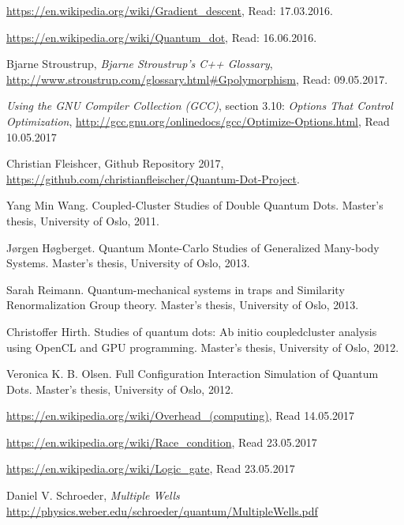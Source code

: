 \documentclass[../main.tex]{subfiles}
\begin{document}
\begin{thebibliography}{99}
 \url{https://en.wikipedia.org/wiki/Gradient_descent}, Read: 17.03.2016.

 \url{https://en.wikipedia.org/wiki/Quantum_dot}, Read: 16.06.2016.

 Bjarne Stroustrup, \emph{Bjarne Stroustrup's C++ Glossary},  \url{http://www.stroustrup.com/glossary.html#Gpolymorphism}, Read: 09.05.2017.

 \emph{Using the GNU Compiler Collection (GCC)}, section 3.10: \emph{Options That Control Optimization}, \url{http://gcc.gnu.org/onlinedocs/gcc/Optimize-Options.html}, Read 10.05.2017

 Christian Fleishcer, Github Repository 2017,  \url{https://github.com/christianfleischer/Quantum-Dot-Project}.

 Yang Min Wang. Coupled-Cluster Studies of Double Quantum
Dots. Master’s thesis, University of Oslo, 2011.

 Jørgen Høgberget. Quantum Monte-Carlo Studies of Generalized Many-body Systems. 
Master’s thesis, University of Oslo, 2013.

 Sarah Reimann. Quantum-mechanical systems in traps and Similarity Renormalization Group theory. Master’s thesis, University of Oslo, 2013.

 Christoffer Hirth. Studies of quantum dots: Ab initio coupledcluster analysis using OpenCL and GPU programming. Master’s thesis, University of Oslo, 2012.

 Veronica K. B. Olsen. Full Configuration Interaction Simulation of Quantum Dots. Master’s thesis, University of Oslo, 2012.

 \url{https://en.wikipedia.org/wiki/Overhead_(computing)}, Read 14.05.2017

 \url{https://en.wikipedia.org/wiki/Race_condition}, Read 23.05.2017

 \url{https://en.wikipedia.org/wiki/Logic_gate}, Read 23.05.2017

 Daniel V. Schroeder, \emph{Multiple Wells} \url{http://physics.weber.edu/schroeder/quantum/MultipleWells.pdf}

\end{thebibliography}
\end{document}
